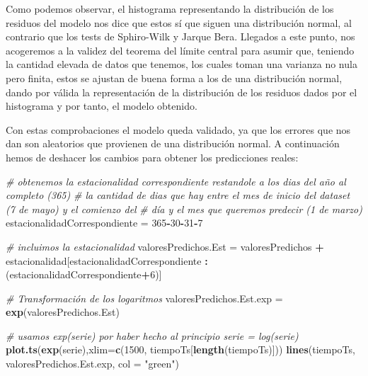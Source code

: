 \documentclass[]{article}
\newenvironment{Shaded}{\begin{snugshade}}{\end{snugshade}}
\newcommand{\KeywordTok}[1]{\textcolor[rgb]{0.13,0.29,0.53}{\textbf{#1}}}
\newcommand{\DataTypeTok}[1]{\textcolor[rgb]{0.13,0.29,0.53}{#1}}
\newcommand{\DecValTok}[1]{\textcolor[rgb]{0.00,0.00,0.81}{#1}}
\newcommand{\StringTok}[1]{\textcolor[rgb]{0.31,0.60,0.02}{#1}}
\newcommand{\CommentTok}[1]{\textcolor[rgb]{0.56,0.35,0.01}{\textit{#1}}}
\newcommand{\OperatorTok}[1]{\textcolor[rgb]{0.81,0.36,0.00}{\textbf{#1}}}
\newcommand{\NormalTok}[1]{#1}
\begin{document}
Como podemos observar, el histograma representando la distribución de
los residuos del modelo nos dice que estos sí que siguen una
distribución normal, al contrario que los tests de Sphiro-Wilk y Jarque
Bera. Llegados a este punto, nos acogeremos a la validez del teorema del
límite central para asumir que, teniendo la cantidad elevada de datos
que tenemos, los cuales toman una varianza no nula pero finita, estos se
ajustan de buena forma a los de una distribución normal, dando por
válida la representación de la distribución de los residuos dados por el
histograma y por tanto, el modelo obtenido.

Con estas comprobaciones el modelo queda validado, ya que los errores
que nos dan son aleatorios que provienen de una distribución normal. A
continuación hemos de deshacer los cambios para obtener los predicciones
reales:

\begin{Shaded}
\begin{Highlighting}[]
\CommentTok{# obtenemos la estacionalidad correspondiente restandole a los dias del año al completo (365)}
\CommentTok{# la cantidad de dias que hay entre el mes de inicio del dataset (7 de mayo) y el comienzo del}
\CommentTok{# día y el mes que queremos predecir (1 de marzo)}
\NormalTok{estacionalidadCorrespondiente =}\StringTok{ }\DecValTok{365}\OperatorTok{-}\DecValTok{30}\OperatorTok{-}\DecValTok{31}\OperatorTok{-}\DecValTok{7}

\CommentTok{# incluimos la estacionalidad}
\NormalTok{valoresPredichos.Est =}\StringTok{ }
\StringTok{  }\NormalTok{valoresPredichos }\OperatorTok{+}\StringTok{ }\NormalTok{estacionalidad[estacionalidadCorrespondiente }\OperatorTok{:}\StringTok{ }\NormalTok{(estacionalidadCorrespondiente}\OperatorTok{+}\DecValTok{6}\NormalTok{)]}

\CommentTok{# Transformación de los logaritmos}
\NormalTok{valoresPredichos.Est.exp =}\StringTok{ }\KeywordTok{exp}\NormalTok{(valoresPredichos.Est)}

\CommentTok{# usamos exp(serie) por haber hecho al principio serie = log(serie) }
\KeywordTok{plot.ts}\NormalTok{(}\KeywordTok{exp}\NormalTok{(serie),}\DataTypeTok{xlim=}\KeywordTok{c}\NormalTok{(}\DecValTok{1500}\NormalTok{, tiempoTs[}\KeywordTok{length}\NormalTok{(tiempoTs)])) }
\KeywordTok{lines}\NormalTok{(tiempoTs, valoresPredichos.Est.exp, }\DataTypeTok{col =} \StringTok{"green"}\NormalTok{)}
\end{Highlighting}
\end{Shaded}
\end{document}
